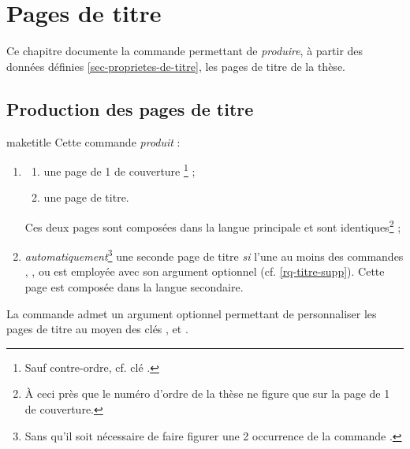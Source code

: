 \chapter{Pages de titre}\label{cha-pages-de-titre}

Ce chapitre documente la commande  permettant de
\emph{produire}, à partir des données définies \vref{sec-proprietes-de-titre},
les pages de titre de la thèse.

\section{Production des pages de titre}

\begin{docCommand}[doc description=\mandatory]{maketitle}{}%
  Cette commande \emph{produit} :
  \begin{enumerate}
  \item
    \begin{enumerate}
    \item une page de 1\iere{} de couverture%
      \footnote{Sauf contre-ordre, cf. clé .} ;
    \item une page de titre.
    \end{enumerate}
    Ces deux pages sont composées dans la langue principale et
    sont identiques\footnote{À ceci près que le numéro d'ordre de la thèse ne figure
      que sur la page de 1\iere{} de couverture.} ;
  \item \emph{automatiquement}\footnote{Sans qu'il soit nécessaire de faire
      figurer une 2\ieme{} occurrence de la commande .} une
    seconde page de titre \emph{si}  l'une au moins des
    commandes , ,  ou
     est employée avec son argument optionnel
    (cf. \vref{rq-titre-supp}). Cette page est composée dans la langue
    secondaire.
  \end{enumerate}
\end{docCommand}

La commande  admet un argument optionnel permettant de
personnaliser les pages de titre au moyen des clés ,
 et .%
%
%
%

